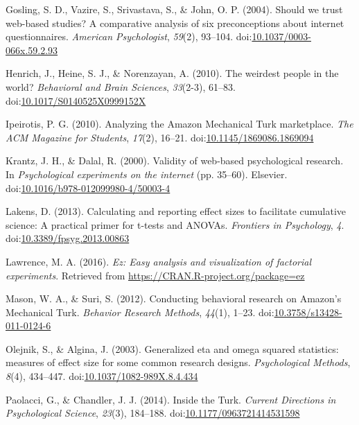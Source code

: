 \documentclass[english,man]{apa6}
\theoremstyle{definition}
\theoremstyle{definition}
\theoremstyle{definition}
\theoremstyle{remark}
\begin{document}
\hypertarget{ref-Gosling2004}{}
Gosling, S. D., Vazire, S., Srivastava, S., \& John, O. P. (2004).
Should we trust web-based studies? A comparative analysis of six
preconceptions about internet questionnaires. \emph{American
Psychologist}, \emph{59}(2), 93--104.
doi:\href{https://doi.org/10.1037/0003-066x.59.2.93}{10.1037/0003-066x.59.2.93}

\hypertarget{ref-Henrich2010}{}
Henrich, J., Heine, S. J., \& Norenzayan, A. (2010). The weirdest people
in the world? \emph{Behavioral and Brain Sciences}, \emph{33}(2-3),
61--83.
doi:\href{https://doi.org/10.1017/S0140525X0999152X}{10.1017/S0140525X0999152X}

\hypertarget{ref-Ipeirotis2010}{}
Ipeirotis, P. G. (2010). Analyzing the Amazon Mechanical Turk
marketplace. \emph{The ACM Magazine for Students}, \emph{17}(2), 16--21.
doi:\href{https://doi.org/10.1145/1869086.1869094}{10.1145/1869086.1869094}

\hypertarget{ref-Krantz2000}{}
Krantz, J. H., \& Dalal, R. (2000). Validity of web-based psychological
research. In \emph{Psychological experiments on the internet} (pp.
35--60). Elsevier.
doi:\href{https://doi.org/10.1016/b978-012099980-4/50003-4}{10.1016/b978-012099980-4/50003-4}

\hypertarget{ref-Lakens2013}{}
Lakens, D. (2013). Calculating and reporting effect sizes to facilitate
cumulative science: A practical primer for t-tests and ANOVAs.
\emph{Frontiers in Psychology}, \emph{4}.
doi:\href{https://doi.org/10.3389/fpsyg.2013.00863}{10.3389/fpsyg.2013.00863}

\hypertarget{ref-Lawrence2016}{}
Lawrence, M. A. (2016). \emph{Ez: Easy analysis and visualization of
factorial experiments}. Retrieved from
\url{https://CRAN.R-project.org/package=ez}

\hypertarget{ref-Mason2012}{}
Mason, W. A., \& Suri, S. (2012). Conducting behavioral research on
Amazon's Mechanical Turk. \emph{Behavior Research Methods},
\emph{44}(1), 1--23.
doi:\href{https://doi.org/10.3758/s13428-011-0124-6}{10.3758/s13428-011-0124-6}

\hypertarget{ref-Olejnik2003}{}
Olejnik, S., \& Algina, J. (2003). Generalized eta and omega squared
statistics: measures of effect size for some common research designs.
\emph{Psychological Methods}, \emph{8}(4), 434--447.
doi:\href{https://doi.org/10.1037/1082-989X.8.4.434}{10.1037/1082-989X.8.4.434}

\hypertarget{ref-Paolacci2014}{}
Paolacci, G., \& Chandler, J. J. (2014). Inside the Turk. \emph{Current
Directions in Psychological Science}, \emph{23}(3), 184--188.
doi:\href{https://doi.org/10.1177/0963721414531598}{10.1177/0963721414531598}
\end{document}
